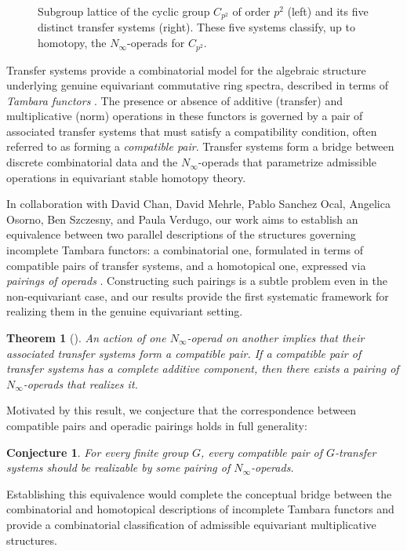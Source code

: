 \documentclass[11pt]{article}
\newtheorem{theorem}{Theorem}
\newtheorem*{conjecture}{Conjecture}
\begin{document}
\begin{figure}[h]
\captionsetup{font=footnotesize} %
\caption{Subgroup lattice of the cyclic group $C_{p^2}$ of order $p^2$  (left) and its five distinct transfer systems (right). These five systems classify, up to homotopy, the $N_\infty$-operads for $C_{p^2}$.}
\label{fig:transferCp2}
\end{figure}

Transfer systems provide a combinatorial model for the algebraic structure underlying genuine equivariant commutative ring spectra, described in terms of {\it Tambara functors} \cite{MR1209937}.
The presence or absence of additive (transfer) and multiplicative (norm) operations in these functors is governed by a pair of associated transfer systems that must satisfy a compatibility condition, often referred to as forming a {\it compatible pair}.
Transfer systems form a bridge between discrete combinatorial data and the $N_\infty$-operads that parametrize admissible operations in equivariant stable homotopy theory.

In collaboration with David Chan, David Mehrle, Pablo Sanchez Ocal, Angelica Osorno, Ben Szczesny, and Paula Verdugo, our work aims to establish an equivalence between two parallel descriptions of the structures governing incomplete Tambara functors:
a combinatorial one, formulated in terms of compatible pairs of transfer systems, and a homotopical one, expressed via {\it pairings of operads} \cite{MR2544392}.
Constructing such pairings is a subtle problem even in the non-equivariant case, and our results provide the first systematic framework for realizing them in the genuine equivariant setting.

\begin{theorem}[\cite{CCM+}]
An action of one $N_\infty$-operad on another implies that their associated transfer systems form a compatible pair.
If a compatible pair of transfer systems has a complete additive component, then there exists a pairing of $N_\infty$-operads that realizes it.
\end{theorem}

Motivated by this result, we conjecture that the correspondence between compatible pairs and operadic pairings holds in full generality:
\begin{conjecture}
 For every finite group $G$, every compatible pair of $G$-transfer systems should be realizable by some pairing of $N_\infty$-operads.
\end{conjecture}
Establishing this equivalence would complete the conceptual bridge between the combinatorial and homotopical descriptions of incomplete Tambara functors and provide a combinatorial classification of admissible equivariant multiplicative structures.
\end{document}
